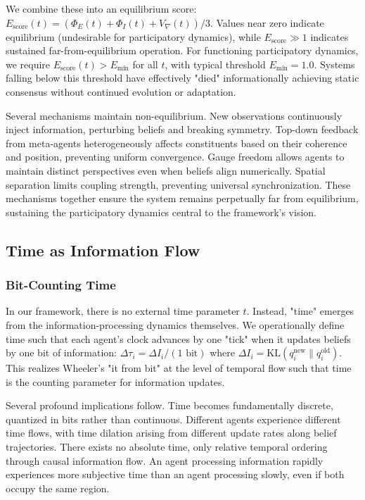 \documentclass[11pt]{article}
\begin{document}
We combine these into an equilibrium score: $E_{\mathrm{score}}(t) = (\Phi_E(t) + \Phi_I(t) + V_{\nabla}(t))/3$. Values near zero indicate equilibrium (undesirable for participatory dynamics), while $E_{\mathrm{score}} \gg 1$ indicates sustained far-from-equilibrium operation. For functioning participatory dynamics, we require $E_{\mathrm{score}}(t) > E_{\min}$ for all $t$, with typical threshold $E_{\min} = 1.0$. Systems falling below this threshold have effectively "died" informationally achieving static consensus without continued evolution or adaptation.

Several mechanisms maintain non-equilibrium. New observations continuously inject information, perturbing beliefs and breaking symmetry. Top-down feedback from meta-agents heterogeneously affects constituents based on their coherence and position, preventing uniform convergence. Gauge freedom allows agents to maintain distinct perspectives even when beliefs align numerically. Spatial separation limits coupling strength, preventing universal synchronization. These mechanisms together ensure the system remains perpetually far from equilibrium, sustaining the participatory dynamics central to the framework's vision.






\subsection{Time as Information Flow}

\subsubsection{Bit-Counting Time}

In our framework, there is no external time parameter $t$. Instead, "time" emerges from the information-processing dynamics themselves. We operationally define time such that each agent's clock advances by one "tick" when it updates beliefs by one bit of information: $\Delta \tau_i = \Delta I_i / (1 \text{ bit})$ where $\Delta I_i = \mathrm{KL}(q_i^{\text{new}} \| q_i^{\text{old}})$. This realizes Wheeler's "it from bit" at the level of temporal flow such that time is the counting parameter for information updates.

Several profound implications follow. Time becomes fundamentally discrete, quantized in bits rather than continuous. Different agents experience different time flows, with time dilation arising from different update rates along belief trajectories. There exists no absolute time, only relative temporal ordering through causal information flow. An agent processing information rapidly experiences more subjective time than an agent processing slowly, even if both occupy the same region.
\end{document}
